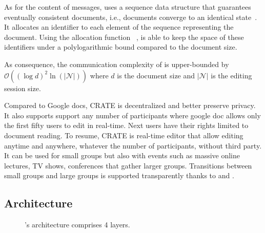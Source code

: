 As for the content of messages, \CRATE uses a sequence data structure
that guarantees eventually consistent documents, i.e., documents
converge to an identical state~\cite{bailis2013eventual}. It allocates
an identifier to each element of the sequence representing the
document. Using the allocation function \LSEQ~\cite{nedelec2013lseq},
\CRATE is able to keep the space of these identifiers under a
polylogarithmic bound compared to the document size.

As consequence, the communication complexity of \CRATE is
upper-bounded by $\mathcal{O}((\log d)^2\ln(|\mathcal{N}|))$ where $d$
is the document size and $|\mathcal{N}|$ is the editing session size.

Compared to Google docs, CRATE is decentralized and better preserve
privacy. It also supports support any number of participants where
google doc allows only the first fifty users to edit in
real-time. Next users have their rights limited to document reading.
To resume, CRATE is real-time editor that allow editing anytime and
anywhere, whatever the number of participants, without third party. It
can be used for small groups but also with events such as massive online
 lectures, TV shows, conferences that gather larger groups. Transitions
 between small groups and large groups is supported transparently
 thanks to \SPRAY and \LSEQ.

\subsection{Architecture}

\begin{figure}
  \centering
  
  \caption{\label{fig:architecture}\CRATE's architecture comprises 4
    layers.}
\end{figure}

